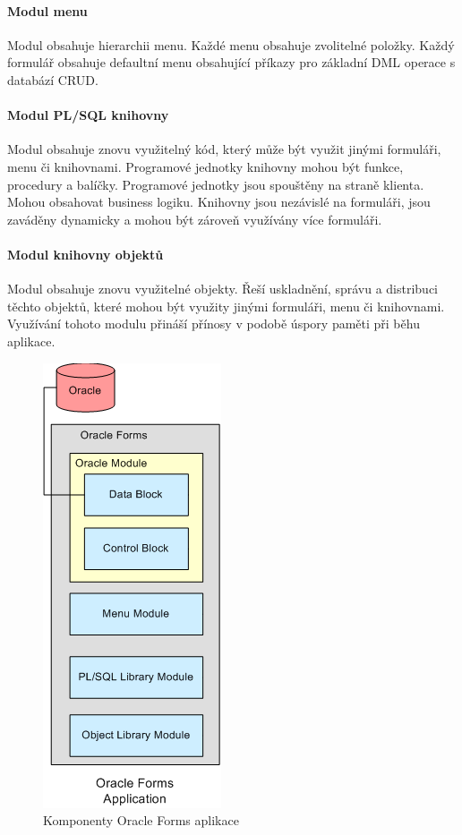 \documentclass{diplomka}
\begin{document}
\paragraph{Modul menu} 
Modul obsahuje hierarchii menu. Každé menu obsahuje zvolitelné položky. Každý formulář obsahuje defaultní menu obsahující příkazy pro základní DML operace s databází CRUD.

\paragraph{Modul PL/SQL knihovny}
Modul obsahuje znovu využitelný kód, který může být využit jinými formuláři, menu či knihovnami. Programové jednotky knihovny mohou být funkce, procedury a balíčky. Programové jednotky jsou spouštěny na straně klienta. Mohou obsahovat business logiku. Knihovny jsou nezávislé na formuláři, jsou zaváděny dynamicky a mohou být zároveň využívány více formuláři.

\paragraph{Modul knihovny objektů}
Modul obsahuje znovu využitelné objekty. Řeší uskladnění, správu a distribuci těchto objektů, které mohou být využity jinými formuláři, menu či knihovnami. Využívání tohoto modulu přináší přínosy v podobě úspory paměti při běhu aplikace.

\begin{figure}[H]
  \centering
  \includegraphics[scale=0.8]{obr/forms_arch3.png}
\caption{Komponenty Oracle Forms aplikace\cite{microsoft}}
\label{fig:arch3}
\end{figure}
\newpage
\end{document}
